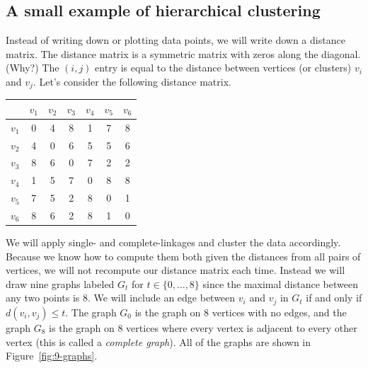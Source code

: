 \documentclass[a4paper, 12pt]{article}
\numberwithin{equation}{section}
\numberwithin{figure}{section}
\theoremstyle{definition}
\renewcommand{\leq}{\leqslant}
\begin{document}
\subsection{A small example of hierarchical clustering}

Instead of writing down or plotting data points, we will write down a distance
matrix. The distance matrix is a symmetric matrix with zeros along the diagonal.
(Why?) The $(i,j)$ entry is equal to the distance between vertices (or clusters)
$v_i$ and $v_j$. Let's consider the following distance matrix.
\begin{center}
	\begin{tabular}{c|cccccc}
		& $v_1$ & $v_2$ & $v_3$ & $v_4$ & $v_5$ & $v_6$ \\ \hline 
		$v_1$ & 0 & 4 & 8 & 1 & 7 & 8 \\
		$v_2$ & 4 & 0 & 6 & 5 & 5 & 6 \\
		$v_3$ & 8 & 6 & 0 & 7 & 2 & 2 \\
		$v_4$ & 1 & 5 & 7 & 0 & 8 & 8 \\
		$v_5$ & 7 & 5 & 2 & 8 & 0 & 1 \\
		$v_6$ & 8 & 6 & 2 & 8 & 1 & 0 
	\end{tabular}
\end{center}

We will apply single- and complete-linkages and cluster the data accordingly.
Because we know how to compute them both given the distances from all pairs of
vertices, we will not recompute our distance matrix each time. Instead we will
draw nine graphs labeled $G_t$ for $t\in \{0, \dots, 8\}$ since the maximal
distance between any two points is $8$. We will include an edge between $v_i$
and $v_j$ in $G_t$ if and only if $d(v_i, v_j)\leq t$. The graph $G_0$ is the
graph on 8 vertices with no edges, and the graph $G_8$ is the graph on 8
vertices where every vertex is adjacent to every other vertex (this is called a
\emph{complete graph}). All of the graphs are shown in Figure~\ref{fig:9-graphs}.
\end{document}
